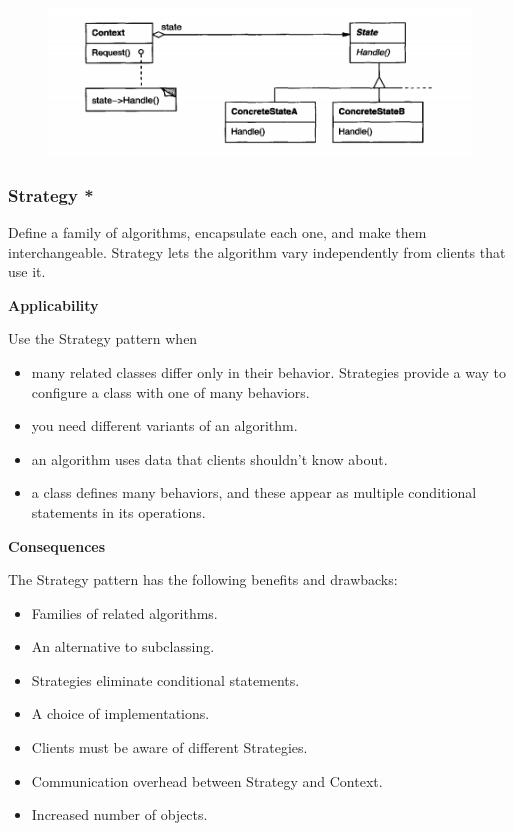 \documentclass{article}
\begin{document}
\begin{figure}[h]
    \centering
    \includegraphics[width=14cm]{diagrams/pattern-20-state.png}
\end{figure}

\newpage
\subsubsection{Strategy *}
Define a family of algorithms, encapsulate each one, and make them
interchangeable. Strategy lets the algorithm vary independently from clients that use it.

\textbf{Applicability}

Use the Strategy pattern when

\begin{itemize}
    \item many related classes differ only in their behavior. Strategies provide a way to configure a class with one of many behaviors. 
    \item you need different variants of an algorithm. 
    \item an algorithm uses data that clients shouldn't know about.
    \item a class defines many behaviors, and these appear as multiple conditional statements in its operations.
\end{itemize}

\textbf{Consequences}

The Strategy pattern has the following benefits and drawbacks:
\begin{itemize}
    \item Families of related algorithms.
    \item An alternative to subclassing.
    \item Strategies eliminate conditional statements. 
    \item A choice of implementations. 
    \item Clients must be aware of different Strategies.
    \item Communication overhead between Strategy and Context.
    \item Increased number of objects.
\end{itemize}
\end{document}
